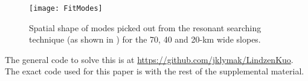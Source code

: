 \documentclass[10pt]{article}
\begin{document}
\begin{appendix}
\begin{figure}[htbp]
  \begin{center}
    \texttt{[image: FitModes]}
    \caption{Spatial shape of modes picked out from the resonant searching technique (as shown in ) for the 70, 40 and 20-km wide slopes.  
            \label{fig:FitModes} }
  \end{center}
\end{figure}

The general code to solve this is at \url{https://github.com/jklymak/LindzenKuo}.  The exact code used for this paper is with the rest of the supplemental material.  

%
%
%
%
%
%
\end{appendix}

{}
{\clearpage}




%
\end{document}
